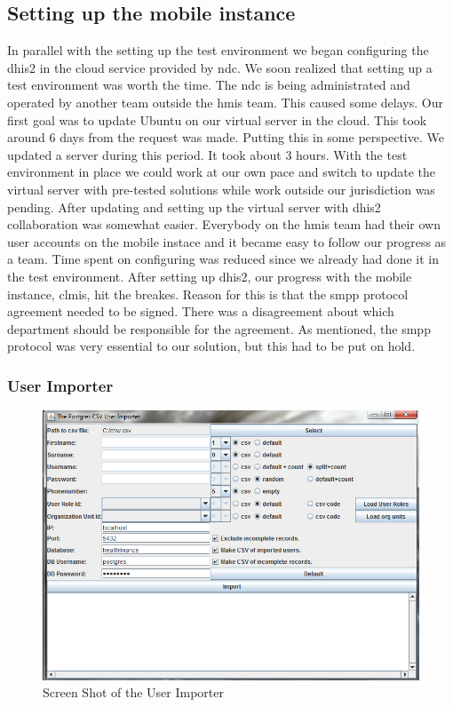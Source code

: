 \subsection{Setting up the mobile instance}
In parallel with the setting up the test environment we began configuring the \gls{dhis2} in the cloud service provided by \gls{ndc}. 
We soon realized that setting up a test environment was worth the time. 
The \gls{ndc} is being administrated and operated by another team outside the \gls{hmis} team. 
This caused some delays. Our first goal was to update Ubuntu on our virtual server in the cloud. 
This took around 6 days from the request was made. Putting this in some perspective. We updated a server during this period. It took about 3 hours. With the test environment in place we could work at our own pace and switch to update the virtual server with pre-tested solutions while work outside our jurisdiction was pending. After updating and setting up the virtual server with \gls{dhis2} collaboration was somewhat easier. Everybody on the \gls{hmis} team had their own user accounts on the mobile instace and it became easy to follow our progress as a team. Time spent on configuring was reduced since we already had done it in the test environment.
After setting up \gls{dhis2}, our progress with the mobile instance, \gls{clmis}, hit the breakes. 
Reason for this is that the \gls{smpp} protocol agreement needed to be signed. There was a disagreement about which department should be responsible for the agreement. As mentioned, the \gls{smpp} protocol was very essential to our solution, but this had to be put on hold.


\subsubsection{User Importer}

\begin{figure}
\centering
\includegraphics[width=\textwidth]{case/img/userImporterScreenShot}
\caption{Screen Shot of the User Importer}
\label{fig:screenUser}
\end{figure}

